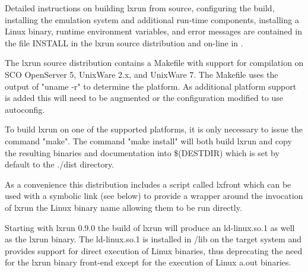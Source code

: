 \documentclass[letterpaper]{article}
\begin{document}
Detailed instructions on building lxrun from source, configuring the build, 
installing the emulation system and additional run-time components, installing 
a Linux binary, runtime environment variables, and error messages are contained
in the file {\ttfamily INSTALL} in the lxrun source distribution and on-line in
.

The lxrun source distribution contains a Makefile with support for compilation
on SCO OpenServer 5, UnixWare 2.x, and UnixWare 7. The Makefile uses the
output of "uname -r" to determine the platform. As additional
platform support is added this will need to be augmented or the configuration
modified to use autoconfig.

To build lxrun on one of the supported platforms, it is only necessary to
issue the command "make". The command "make install" will both build lxrun
and copy the resulting binaries and documentation into \$(DESTDIR) which
is set by default to the ./dist directory.

As a convenience this distribution includes a script called 
lxfront which can be used with a symbolic link (see below) to provide 
a wrapper around the invocation of lxrun the Linux binary name
allowing them to be run directly.

Starting with lxrun 0.9.0 the build of lxrun will produce an ld-linux.so.1
as well as the lxrun binary. The ld-linux.so.1 is installed in /lib on the
target system and provides support for direct execution of Linux binaries,
thus deprecating the need for the lxrun binary front-end except for the
execution of Linux a.out binaries.
\end{document}

